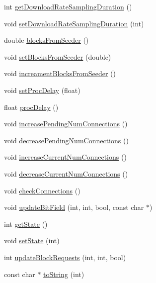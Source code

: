 \begin{DoxyCompactItemize}
\item 
int \hyperlink{classBTPeerWireBase_a45e9486bf6a08a2d934116bb123b3f76}{get\+Download\+Rate\+Sampling\+Duration} ()
\item 
void \hyperlink{classBTPeerWireBase_acd98be8adb3693de3865c646bead6020}{set\+Download\+Rate\+Sampling\+Duration} (int)
\item 
double \hyperlink{classBTPeerWireBase_a4a61b6e3fffa24a52632365dac8e1fe1}{blocks\+From\+Seeder} ()
\item 
void \hyperlink{classBTPeerWireBase_a43078197377df283deb4a705dd76516c}{set\+Blocks\+From\+Seeder} (double)
\item 
void \hyperlink{classBTPeerWireBase_ac2c593879a386a1391639846224fb8b5}{increament\+Blocks\+From\+Seeder} ()
\item 
void \hyperlink{classBTPeerWireBase_a2f99ecdabfa39dca3d9cec84bf61932b}{set\+Proc\+Delay} (float)
\item 
float \hyperlink{classBTPeerWireBase_a53d8619da352c6cd1122dde0f7c890bc}{proc\+Delay} ()
\item 
void \hyperlink{classBTPeerWireBase_af0e1b0b39d53a590f764df081dce141b}{increase\+Pending\+Num\+Connections} ()
\item 
void \hyperlink{classBTPeerWireBase_abf6a9874393313bc542fd589277672f0}{decrease\+Pending\+Num\+Connections} ()
\item 
void \hyperlink{classBTPeerWireBase_a171ff2a801c7c4258f47f1f530746f11}{increase\+Current\+Num\+Connections} ()
\item 
void \hyperlink{classBTPeerWireBase_aae62beb7d0021fab6a3dd17b76af47a3}{decrease\+Current\+Num\+Connections} ()
\item 
void \hyperlink{classBTPeerWireBase_a2937fc536deecbda9c861154a7ca65de}{check\+Connections} ()
\item 
void \hyperlink{classBTPeerWireBase_aabe8d2fba3a2da7a32690baca39be942}{update\+Bit\+Field} (int, int, bool, const char $\ast$)
\item 
int \hyperlink{classBTPeerWireBase_a661bbe1ff3795579bd6f2fc23fbe9b2c}{get\+State} ()
\item 
void \hyperlink{classBTPeerWireBase_a9abbdc9337cd510dbb05234bf94731ed}{set\+State} (int)
\item 
int \hyperlink{classBTPeerWireBase_a4c89b0458e21469e451cba1e4dca7516}{update\+Block\+Requests} (int, int, bool)
\item 
const char $\ast$ \hyperlink{classBTPeerWireBase_a3092c670ad079c66a079e0f44db3da2b}{to\+String} (int)
\end{DoxyCompactItemize}
